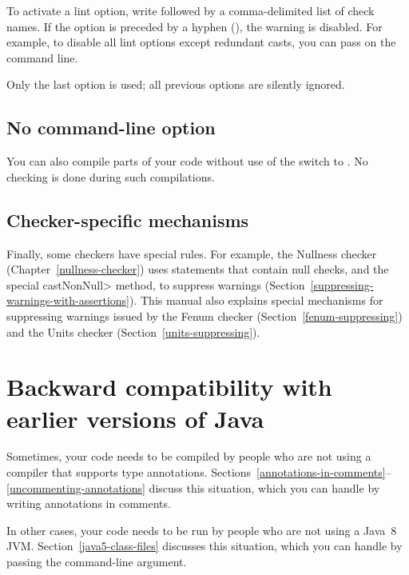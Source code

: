 
\noindent
To activate a lint option, write  followed by a
comma-delimited list of check names.  If the option is preceded by a
hyphen (\code{-}), the warning is disabled.  For example, to disable all
lint options except redundant casts, you can pass
 on the command line.

Only the last  option is used; all previous 
options are silently ignored.


\subsection{No  command-line option\label{no-processor}}

You can also compile parts of your code without use of the
 switch to .  No checking is done during
such compilations.

\subsection{Checker-specific mechanisms\label{checker-specific-suppression}}

Finally, some checkers have special rules.  For example, the Nullness
checker (Chapter~\ref{nullness-checker}) uses  statements that contain
null checks, and the special \<castNonNull> method, to suppress warnings
(Section~\ref{suppressing-warnings-with-assertions}).
This manual also explains special mechanisms for
suppressing warnings issued by the Fenum checker
(Section~\ref{fenum-suppressing}) and the Units checker
(Section~\ref{units-suppressing}).


\section{Backward compatibility with earlier versions of Java\label{backward-compatibility}}

Sometimes, your code needs to be compiled by people who are not using a
compiler that supports type annotations.
Sections~\ref{annotations-in-comments}--\ref{uncommenting-annotations}
discuss this situation, which you can handle by writing annotations in
comments.

In other cases, your code needs to be run by people who are not using a Java~8
JVM\@.  Section~\ref{java5-class-files} discusses this situation, which
you can handle by passing the  command-line argument.

